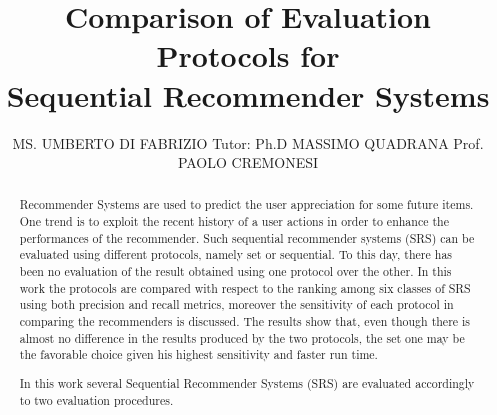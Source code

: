 \documentclass[prodmode,acmtecs]{acmsmall} %
\begin{document}

\title{Comparison of Evaluation Protocols for\\ Sequential Recommender Systems }
\author{
MS. UMBERTO DI FABRIZIO
Tutor: Ph.D MASSIMO QUADRANA
Prof. PAOLO CREMONESI
}
\begin{abstract}
Recommender Systems are used to predict the user appreciation for some future items. One trend is to exploit the recent history of a user actions in order to enhance the performances of the recommender. Such sequential recommender systems (SRS) can be evaluated using different protocols, namely set or sequential. To this day, there has been no evaluation of the result obtained using one protocol over the other. In this work the protocols are compared with respect to the ranking among six classes of SRS using both precision and recall metrics, moreover the sensitivity of each protocol in comparing the recommenders is discussed. The results show that, even though there is almost no difference in the results produced by the two protocols, the set one may be the favorable choice given his highest sensitivity and faster run time.  
\end{abstract}
 

\maketitle


\begin{abstract}
	In this work several Sequential Recommender Systems (SRS) are evaluated accordingly to two evaluation procedures.
\end{abstract}


\end{document}
